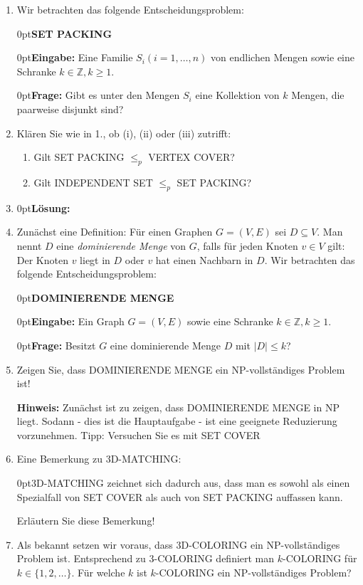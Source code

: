 \documentclass[12pt,a4paper]{scrreprt}
\newcommand{\prob}[1]{\vspace{.5\baselineskip}\begin{addmargin}[15pt]{0pt}\textbf{#1}\end{addmargin}}
\newcommand{\ein}[1]{\vspace{.5\baselineskip}\begin{addmargin}[15pt]{0pt}\textbf{Eingabe: }#1\end{addmargin}}
\newcommand{\fra}[1]{\vspace{.5\baselineskip}\begin{addmargin}[15pt]{0pt}\textbf{Frage: }#1\end{addmargin}}
\newcommand{\loesung}[1]{\vspace{.5\baselineskip}\begin{addmargin}[0pt]{0pt}\textbf{Lösung: }#1\end{addmargin}}
\newcommand{\pr}{$\leq_p$ }%
\begin{document}
\begin{enumerate}
{}

\item Wir betrachten das folgende Entscheidungsproblem:

\prob{SET PACKING}

\ein{Eine Familie $S_i (i = 1 , \ldots, n)$ von endlichen Mengen sowie eine Schranke $k \in \mathds{Z}, k\geq 1$.}

\fra{Gibt es unter den Mengen $S_i$ eine Kollektion von $k$ Mengen, die paarweise disjunkt sind?}

\item[] Klären Sie wie in 1., ob (i), (ii) oder (iii) zutrifft:

\begin{enumerate}
	\item Gilt SET PACKING \pr VERTEX COVER?
	\item Gilt INDEPENDENT SET \pr SET PACKING?
\end{enumerate}

\item[]\loesung{}

\item Zunächst eine Definition: Für einen Graphen $G = (V,E)$ sei $D \subseteq V$. Man nennt $D$ eine \emph{dominierende Menge} von $G$, falls für jeden Knoten $v \in V$ gilt: Der Knoten $v$ liegt in $D$ oder $v$ hat einen Nachbarn in $D$. Wir betrachten das folgende Entscheidungsproblem:

\prob{DOMINIERENDE MENGE}

\ein{Ein Graph $G = (V, E)$ sowie eine Schranke $k \in \mathds{Z}, k \geq 1$.}

\fra{Besitzt $G$ eine dominierende Menge $D$ mit $|D| \leq k$?}

\item[] Zeigen Sie, dass DOMINIERENDE MENGE ein NP-vollständiges Problem ist!

\textbf{Hinweis:} Zunächst ist zu zeigen, dass DOMINIERENDE MENGE in NP liegt. Sodann - dies ist die Hauptaufgabe - ist eine geeignete Reduzierung vorzunehmen. Tipp: Versuchen Sie es mit SET COVER

\item Eine Bemerkung zu 3D-MATCHING:

\begin{addmargin}[30pt]{0pt}3D-MATCHING zeichnet sich dadurch aus, dass man es sowohl als einen Spezialfall von SET COVER als auch von SET PACKING auffassen kann.\end{addmargin}

Erläutern Sie diese Bemerkung!

\item Als bekannt setzen wir voraus, dass 3D-COLORING ein NP-vollständiges Problem ist. Entsprechend zu 3-COLORING definiert man $k$-COLORING für $k \in \{1,2,\ldots\}.$ Für welche $k$ ist $k$-COLORING ein NP-vollständiges Problem?


\end{enumerate}
\end{document}

